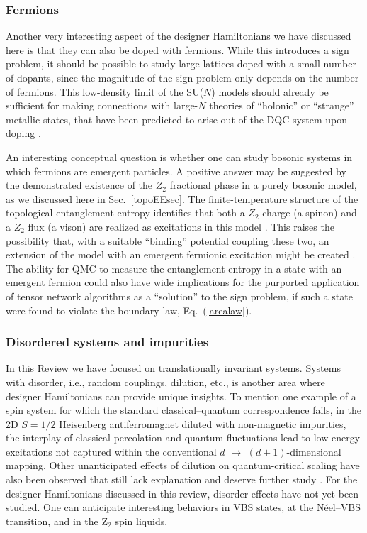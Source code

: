 \documentclass[10pt,pre,aps,twocolumn,showpacs,superscriptaddress,floatfix]{revtex4-1}
\begin{document}
\subsubsection{Fermions}

Another very interesting aspect of the designer Hamiltonians we have discussed here is that they can also be doped with fermions. While this 
introduces a sign problem, it should be possible to study large lattices doped with a small number of dopants, since the magnitude of the 
sign problem only depends on the number of fermions. This low-density limit of the SU($N$) models should already be sufficient for making connections 
with large-$N$ theories of ``holonic'' or ``strange'' metallic states, that have been predicted to arise out of the DQC system upon 
doping \cite{kaul2008:u1}.

An interesting conceptual question is whether one can study bosonic systems in which fermions are emergent particles.
A positive answer may be suggested by the demonstrated existence of the $Z_2$ fractional phase in a purely bosonic model, as we
discussed here in Sec.~\ref{topoEEsec}. 
The finite-temperature structure of the topological entanglement entropy identifies that both a $Z_2$ charge (a spinon) and a $Z_2$ flux (a vison) are realized as excitations in this model \cite{TopoEE}.
This raises the possibility that, with a suitable ``binding'' potential \cite{FermionBind} coupling these two, an extension of 
the model with an emergent fermionic excitation might be created \cite{Wenbook}.  
The ability for QMC to measure the entanglement entropy in a state with an emergent fermion
could also have wide implications for the purported application of tensor network algorithms as a ``solution'' to the sign problem, 
if such a state were found to violate the boundary law, Eq.~(\ref{arealaw}). 

\subsubsection{Disordered systems and impurities}

In this Review we have focused on translationally invariant systems. Systems with disorder, i.e., random couplings, dilution, etc., is another area where designer 
Hamiltonians can provide unique insights. To mention one example of a spin system for which the standard classical--quantum correspondence fails, in the 2D $S=1/2$ 
Heisenberg antiferromagnet diluted with non-magnetic impurities, the interplay of classical percolation and quantum fluctuations lead to low-energy 
excitations \cite{Wang10} not captured \cite{Vojta05} within the conventional $d$ $\to$ $(d+1)$-dimensional mapping. Other unanticipated effects of dilution 
on quantum-critical scaling have also been observed that still lack explanation and deserve further study \cite{Yu06,Roscilde06,Sandvik06,Roscilde07,Yao10}. 
For the designer Hamiltonians discussed in this review, disorder effects have not yet been studied. One can anticipate interesting behaviors in VBS states, 
at the N\'eel--VBS transition, and in the Z$_2$ spin liquids. 
\end{document}
